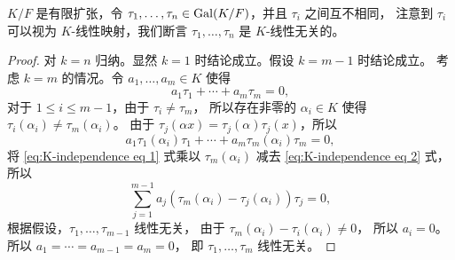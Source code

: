 \begin{lemma}\label{lemma:K-independence}
  $K/F$ 是有限扩张，令 $\tau_1,\dots,\tau_n\in\operatorname{Gal}(K/F)$，并且 $\tau_i$ 之间互不相同，
  注意到 $\tau_i$ 可以视为 $K$-线性映射，我们断言 $\tau_1,\dots,\tau_n$ 是 $K$-线性无关的。
\end{lemma}
\begin{proof}
  对 $k=n$ 归纳。显然 $k=1$ 时结论成立。假设 $k=m-1$ 时结论成立。
  考虑 $k=m$ 的情况。令 $a_1,\dots,a_m\in K$ 使得
  \begin{equation}\label{eq:K-independence eq 1}
    a_1\tau_1+\cdots+a_m\tau_m=0,  
  \end{equation}
  对于 $1\leq i\leq m-1$，由于 $\tau_{i}\neq \tau_m$，
  所以存在非零的 $\alpha_i\in K$ 使得 $\tau_{i}(\alpha_i)\neq\tau_m(\alpha_i)$。
  由于 $\tau_j(\alpha x)=\tau_j(\alpha)\tau_j(x)$，所以
  \begin{equation}\label{eq:K-independence eq 2}
    a_1\tau_1(\alpha_i)\tau_1+\cdots+a_m\tau_m(\alpha_i)\tau_m=0,  
  \end{equation}
  将 \eqref{eq:K-independence eq 1} 式乘以 $\tau_m(\alpha_i)$ 减去
  \eqref{eq:K-independence eq 2} 式，所以
  \[
    \sum_{j=1}^{m-1} a_j(\tau_m(\alpha_i)-\tau_j(\alpha_i))\tau_j=0,
  \]
  根据假设，$\tau_1,\dots,\tau_{m-1}$ 线性无关，
  由于 $\tau_m(\alpha_i)-\tau_{i}(\alpha_i)\neq 0$，
  所以 $a_{i}=0$。所以 $a_1=\cdots=a_{m-1}=a_m=0$，
  即 $\tau_1,\dots,\tau_m$ 线性无关。
\end{proof}

